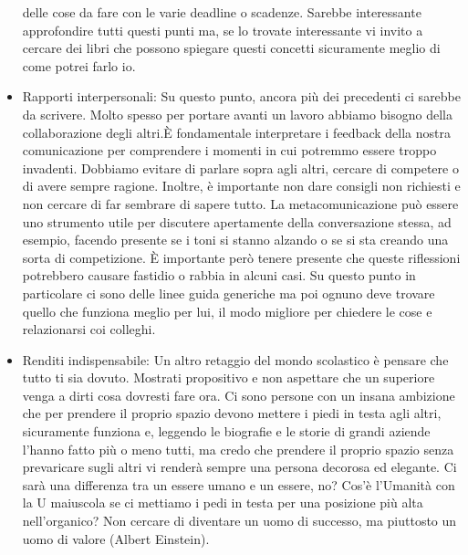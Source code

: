 \documentclass[12pt]{book} %
\begin{document}
\begin{itemize}
delle cose da fare con le varie deadline o scadenze. Sarebbe interessante approfondire tutti questi punti ma, se lo
trovate interessante vi invito a cercare dei libri che possono spiegare questi concetti sicuramente meglio di come
potrei farlo io.
\item Rapporti interpersonali: Su questo punto, ancora più dei precedenti ci sarebbe da scrivere. Molto spesso per
portare avanti un lavoro abbiamo bisogno della collaborazione degli altri.È fondamentale interpretare i feedback della
nostra comunicazione per comprendere i momenti in cui potremmo essere troppo invadenti. Dobbiamo evitare di parlare
sopra agli altri, cercare di competere o di avere sempre ragione. Inoltre, è importante non dare consigli non richiesti
e non cercare di far sembrare di sapere tutto. La metacomunicazione può essere uno strumento utile per discutere
apertamente della conversazione stessa, ad esempio, facendo presente se i toni si stanno alzando o se si sta creando
una sorta di competizione. È importante però tenere presente che queste riflessioni potrebbero causare fastidio o
rabbia in alcuni casi. Su questo punto in particolare ci sono delle linee guida generiche ma poi ognuno deve trovare
quello che funziona meglio per lui, il modo migliore per chiedere le cose e relazionarsi coi colleghi.
\item Renditi indispensabile: Un altro retaggio del mondo scolastico è pensare che tutto ti sia dovuto. Mostrati
propositivo e non aspettare che un superiore venga a dirti cosa dovresti fare ora. Ci sono persone con un insana
ambizione che per prendere il proprio spazio devono mettere i piedi in testa agli altri, sicuramente funziona e,
leggendo le biografie e le storie di grandi aziende l'hanno fatto più o meno tutti, ma credo che
prendere il proprio spazio senza prevaricare sugli altri vi renderà sempre una persona decorosa ed elegante. Ci sarà
una differenza tra un essere umano e un essere, no? Cos'è l'Umanità con la U
maiuscola se ci mettiamo i pedi in testa per una posizione più alta nell'organico?\newline
Non cercare di diventare un uomo di successo, ma piuttosto un uomo di valore (Albert Einstein).
\end{itemize}

\bigskip
\end{document}
